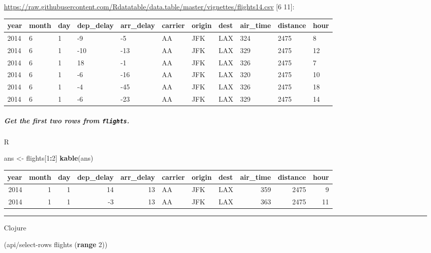 \documentclass[]{article}
\newenvironment{Shaded}{\begin{snugshade}}{\end{snugshade}}
\newcommand{\DecValTok}[1]{\textcolor[rgb]{0.00,0.00,0.81}{#1}}
\newcommand{\KeywordTok}[1]{\textcolor[rgb]{0.13,0.29,0.53}{\textbf{#1}}}
\newcommand{\NormalTok}[1]{#1}
\newcommand{\OperatorTok}[1]{\textcolor[rgb]{0.81,0.36,0.00}{\textbf{#1}}}
\newcommand{\StringTok}[1]{\textcolor[rgb]{0.31,0.60,0.02}{#1}}
\let\oldsubparagraph\subparagraph
\renewcommand{\subparagraph}[1]{\oldsubparagraph{#1}\mbox{}}
\begin{document}
\url{https://raw.githubusercontent.com/Rdatatable/data.table/master/vignettes/flights14.csv}
{[}6 11{]}:

\begin{longtable}[]{@{}lllllllllll@{}}
\toprule
year & month & day & dep\_delay & arr\_delay & carrier & origin & dest &
air\_time & distance & hour\tabularnewline
\midrule
\endhead
2014 & 6 & 1 & -9 & -5 & AA & JFK & LAX & 324 & 2475 & 8\tabularnewline
2014 & 6 & 1 & -10 & -13 & AA & JFK & LAX & 329 & 2475 &
12\tabularnewline
2014 & 6 & 1 & 18 & -1 & AA & JFK & LAX & 326 & 2475 & 7\tabularnewline
2014 & 6 & 1 & -6 & -16 & AA & JFK & LAX & 320 & 2475 &
10\tabularnewline
2014 & 6 & 1 & -4 & -45 & AA & JFK & LAX & 326 & 2475 &
18\tabularnewline
2014 & 6 & 1 & -6 & -23 & AA & JFK & LAX & 329 & 2475 &
14\tabularnewline
\bottomrule
\end{longtable}

\hypertarget{get-the-first-two-rows-from-flights.}{%
\subparagraph{\texorpdfstring{Get the first two rows from
\texttt{flights}.}{Get the first two rows from flights.}}\label{get-the-first-two-rows-from-flights.}}

R

\begin{Shaded}
\begin{Highlighting}[]
\NormalTok{ans <-}\StringTok{ }\NormalTok{flights[}\DecValTok{1}\OperatorTok{:}\DecValTok{2}\NormalTok{]}
\KeywordTok{kable}\NormalTok{(ans)}
\end{Highlighting}
\end{Shaded}

\begin{longtable}[]{@{}rrrrrlllrrr@{}}
\toprule
year & month & day & dep\_delay & arr\_delay & carrier & origin & dest &
air\_time & distance & hour\tabularnewline
\midrule
\endhead
2014 & 1 & 1 & 14 & 13 & AA & JFK & LAX & 359 & 2475 & 9\tabularnewline
2014 & 1 & 1 & -3 & 13 & AA & JFK & LAX & 363 & 2475 & 11\tabularnewline
\bottomrule
\end{longtable}

\begin{center}\rule{0.5\linewidth}{0.5pt}\end{center}

Clojure

\begin{Shaded}
\begin{Highlighting}[]
\NormalTok{(api/select-rows flights (}\KeywordTok{range} \DecValTok{2}\NormalTok{))}
\end{Highlighting}
\end{Shaded}
\end{document}
